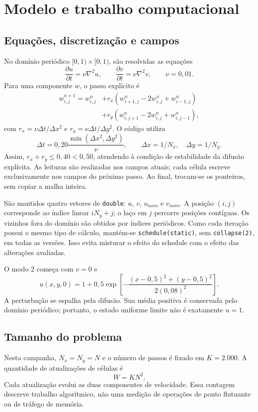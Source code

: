 \documentclass[12pt,a4paper]{article}
\begin{document}
\section{Modelo e trabalho computacional}
\subsection{Equações, discretização e campos}
No domínio periódico $[0,1)\times[0,1)$, são resolvidas as equações
\[
\frac{\partial u}{\partial t}=\nu\nabla^2u,
\qquad
\frac{\partial v}{\partial t}=\nu\nabla^2v,
\qquad \nu=0{,}01.
\]
Para uma componente $w$, o passo explícito é
\begin{equation}
\begin{split}
w^{n+1}_{i,j}=w^n_{i,j}
&+r_x(w^n_{i+1,j}-2w^n_{i,j}+w^n_{i-1,j})\\
&+r_y(w^n_{i,j+1}-2w^n_{i,j}+w^n_{i,j-1}),
\end{split}
\end{equation}
com $r_x=\nu\Delta t/\Delta x^2$ e $r_y=\nu\Delta t/\Delta y^2$. O código utiliza
\[
\Delta t=0{,}20\frac{\min(\Delta x^2,\Delta y^2)}{\nu},
\qquad \Delta x=1/N_x,\quad\Delta y=1/N_y.
\]
Assim, $r_x+r_y\leq0{,}40<0{,}50$, atendendo à condição de estabilidade da difusão explícita. As leituras são realizadas nos campos atuais; cada célula escreve exclusivamente nos campos do próximo passo. Ao final, trocam-se os ponteiros, sem copiar a malha inteira.

São mantidos quatro vetores de \texttt{double}: $u$, $v$, $u_{novo}$ e $v_{novo}$. A posição $(i,j)$ corresponde ao índice linear $iN_y+j$; o laço em $j$ percorre posições contíguas. Os vizinhos fora do domínio são obtidos por índices periódicos. Como cada iteração possui o mesmo tipo de cálculo, mantém-se \texttt{schedule(static)}, sem \texttt{collapse(2)}, em todas as versões. Isso evita misturar o efeito do schedule com o efeito das alterações avaliadas.

O modo 2 começa com $v=0$ e
\[
u(x,y,0)=1+0{,}5\exp\!\left[-\frac{(x-0{,}5)^2+(y-0{,}5)^2}{2(0{,}08)^2}\right].
\]
A perturbação se espalha pela difusão. Sua média positiva é conservada pelo domínio periódico; portanto, o estado uniforme limite não é exatamente $u=1$.

\subsection{Tamanho do problema}
Nesta campanha, $N_x=N_y=N$ e o número de passos é fixado em $K=2.000$. A quantidade de atualizações de células é
\begin{equation}
W=KN^2.
\label{eq:trabalho}
\end{equation}
Cada atualização evolui as duas componentes de velocidade. Essa contagem descreve trabalho algorítmico, não uma medição de operações de ponto flutuante ou de tráfego de memória.
\end{document}
